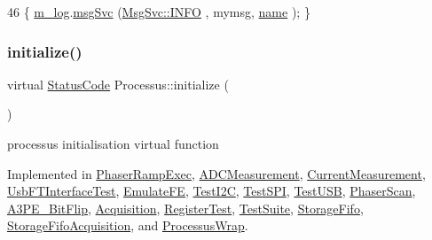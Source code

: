 \begin{DoxyCode}
46 \{ \hyperlink{classObject_a0d269813dd7ac1f24bc143031e2963f2}{m\_log}.\hyperlink{classMsgSvc_ad25f18047920cc59a314e5098259711c}{msgSvc} (\hyperlink{classMsgSvc_ae671eb7301996cd049d2da8a65925926ad2fcf3f3e734fc41ee097cc23670ce51}{MsgSvc::INFO}    , mymsg, \hyperlink{classObject_a300f4c05dd468c7bb8b3c968868443c1}{name} ); \}
\end{DoxyCode}
\mbox{\label{classProcessus_aee88ad7b77ae7319cf8b128e9dd2ea11}} 
\subsubsection{\texorpdfstring{initialize()}{initialize()}}
{\footnotesize\ttfamily virtual \hyperlink{classStatusCode}{Status\+Code} Processus\+::initialize (\begin{DoxyParamCaption}{ }\end{DoxyParamCaption})\hspace{0.3cm}{\ttfamily [pure virtual]}}

processus initialisation virtual function 

Implemented in \hyperlink{classPhaserRampExec_ae6f90f2ecf4b66d6f9bc85b123587ef3}{Phaser\+Ramp\+Exec}, \hyperlink{classADCMeasurement_a3fc6d3e863fecc7a1caf91f9b0ca5268}{A\+D\+C\+Measurement}, \hyperlink{classCurrentMeasurement_a88d397682cb5847d5710d08544b6f4c6}{Current\+Measurement}, \hyperlink{classUsbFTInterfaceTest_a68831f83830305e65d830c55af16e878}{Usb\+F\+T\+Interface\+Test}, \hyperlink{classEmulateFE_aeb689a366ed5e675d02d08ee787d338e}{Emulate\+FE}, \hyperlink{classTestI2C_a3f928813a5e26e0f9b6d851e16781a33}{Test\+I2C}, \hyperlink{classTestSPI_ab2c54cd233a04a583d96fde1f81d4bd6}{Test\+S\+PI}, \hyperlink{classTestUSB_ae7cca13f49e4180c93f9f5a3cbd05985}{Test\+U\+SB}, \hyperlink{classPhaserScan_aeb0dccb02754b11c19719962f7c43fb8}{Phaser\+Scan}, \hyperlink{classA3PE__BitFlip_a88dc6cfe690a518e38ff6d89026e6e0c}{A3\+P\+E\+\_\+\+Bit\+Flip}, \hyperlink{classAcquisition_acffc6b70b80811657409f92e489584ba}{Acquisition}, \hyperlink{classRegisterTest_a77354dcd379c33deae6b713a1ba697b5}{Register\+Test}, \hyperlink{classTestSuite_a78793d8c648ce1c47671c263014ab394}{Test\+Suite}, \hyperlink{classStorageFifo_a568becd5cb8d0cb5307a39e0d27fb332}{Storage\+Fifo}, \hyperlink{classStorageFifoAcquisition_a9cf77a05d754282e7737fb439bfa835d}{Storage\+Fifo\+Acquisition}, and \hyperlink{structProcessusWrap_a7cf48f51e6ac8173255417654cc0b499}{Processus\+Wrap}.




